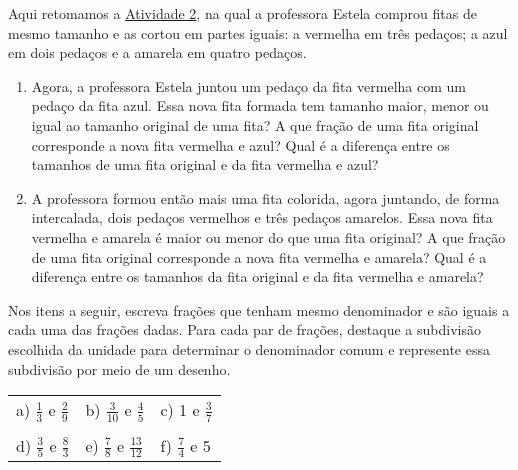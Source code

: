 \begin{atividade}{}\label{chap5-ativ6}

Aqui retomamos a \hyperref[chap5-ativ2]{Atividade 2}, na qual a professora Estela comprou fitas de mesmo tamanho e as cortou em partes iguais: a vermelha em três pedaços; a azul em dois pedaços e a amarela em quatro pedaços.

\begin{center}
\end{center}

\begin{enumerate}
  \item  Agora, a professora Estela juntou um pedaço da fita vermelha com um pedaço da fita azul. Essa nova fita formada tem tamanho maior, menor ou igual ao tamanho original de uma fita? A que fração de uma fita original corresponde a nova fita vermelha e azul? Qual é a diferença entre os tamanhos de uma fita original e da fita vermelha e azul?
  \item  A professora formou então mais uma fita colorida, agora juntando, de for\-ma intercalada, dois pedaços vermelhos e três pedaços amarelos. Essa nova fita vermelha e amarela é maior ou menor do que uma fita original? A que fração de uma fita original corresponde a nova fita vermelha e amarela? Qual é a diferença entre os tamanhos da fita original e da fita vermelha e amarela?
\end{enumerate}

\end{atividade}

\begin{atividade}{}\label{chap5-ativ7}


Nos itens a seguir, escreva frações que tenham mesmo denominador e são iguais a cada uma das frações dadas.
Para cada par de frações, destaque a subdivisão escolhida da unidade para determinar o denominador comum e represente essa subdivisão por meio de um desenho.

\begin{center}
  \begin{tabular}{m{}m{}m{}}

     a) $\frac{1}{3}$ e $\frac{2}{9}$  &   b) $\frac{3}{10}$ e $\frac{4}{5}$  &   c) 1 e $\frac{3}{7}$  \\
     \\
     d) $\frac{3}{5}$ e $\frac{8}{3}$  &   e) $\frac{7}{8}$ e $\frac{13}{12}$  &  f) $\frac{7}{4}$ e 5
  \end{tabular}
\end{center}
\end{atividade}

